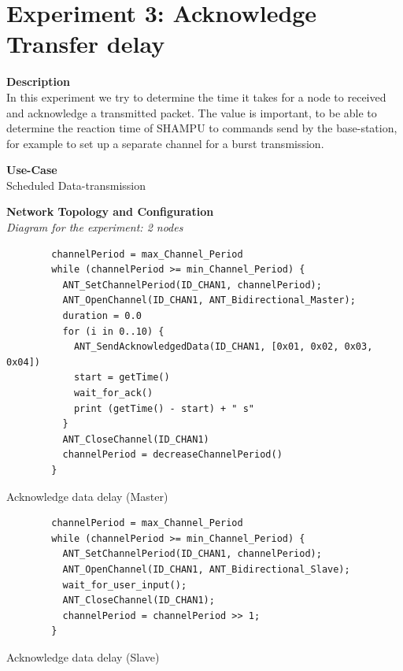 \section{Experiment 3: Acknowledge Transfer delay}
\begin{description} 
	\item{\textbf{Description}} \hfill \\ In this experiment we try to determine the time it takes for a node to received and acknowledge a transmitted packet. The value is important, to be able to determine the reaction time of SHAMPU to commands send by the base-station, for example to set up a separate channel for a burst transmission.
	\item{\textbf{Use-Case}} \hfill \\ Scheduled Data-transmission
	\item{\textbf{Network Topology and Configuration}} \hfill \\ \textit{Diagram for the experiment:  2 nodes} \\
	\begin{code}[H]
		\begin{verbatim}
		channelPeriod = max_Channel_Period
		while (channelPeriod >= min_Channel_Period) {
		  ANT_SetChannelPeriod(ID_CHAN1, channelPeriod);
		  ANT_OpenChannel(ID_CHAN1, ANT_Bidirectional_Master);
		  duration = 0.0
		  for (i in 0..10) {
		    ANT_SendAcknowledgedData(ID_CHAN1, [0x01, 0x02, 0x03, 0x04])
		    start = getTime()	   
		    wait_for_ack()		
		    print (getTime() - start) + " s"	  
		  }
		  ANT_CloseChannel(ID_CHAN1)		
		  channelPeriod = decreaseChannelPeriod()
		} 
		\end{verbatim}
		\caption{Acknowledge data delay (Master)}\label{lst:mExp3}
	\end{code}
	
	\begin{code}[H]
		\begin{verbatim}
		channelPeriod = max_Channel_Period
		while (channelPeriod >= min_Channel_Period) {
		  ANT_SetChannelPeriod(ID_CHAN1, channelPeriod);
		  ANT_OpenChannel(ID_CHAN1, ANT_Bidirectional_Slave);				 
		  wait_for_user_input();
		  ANT_CloseChannel(ID_CHAN1);
		  channelPeriod = channelPeriod >> 1;
		}
		\end{verbatim}
		\caption{Acknowledge data delay (Slave)}\label{lst:sExp3}
	\end{code}
	

\end{description}
